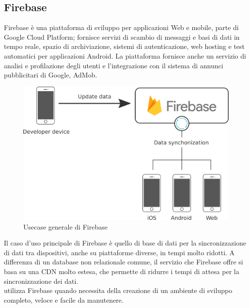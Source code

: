    \subsection{Firebase}
   Firebase è una piattaforma di sviluppo per applicazioni Web e mobile, parte di Google Cloud Platform; fornisce servizi di scambio di messaggi e basi di dati in tempo reale, spazio di archiviazione, sistemi di autenticazione, web hosting e test automatici per applicazioni Android. La piattaforma fornisce anche un servizio di analisi e profilazione degli utenti e l'integrazione con il sistema di annunci pubblicitari di Google, AdMob.
   \begin{figure}[H]
      \begin{center}
         \includegraphics[width=14cm,keepaspectratio]{immagini/firebase-usecase}
      \end{center}
      \caption{Usecase generale di Firebase}
   \end{figure}
   Il caso d'uso principale di Firebase è quello di base di dati per la sincronizzazione di dati tra dispositivi, anche su piattaforme diverse, in tempi molto ridotti. A differenza di un database non relazionale comune, il servizio che Firebase offre si basa su una \gls{CDN} molto estesa, che permette di ridurre i tempi di attesa per la sincronizzazione dei dati.
   \\
   \nomeAzienda{} utilizza Firebase quando necessita della creazione di un ambiente di sviluppo completo, veloce e facile da manutenere.

